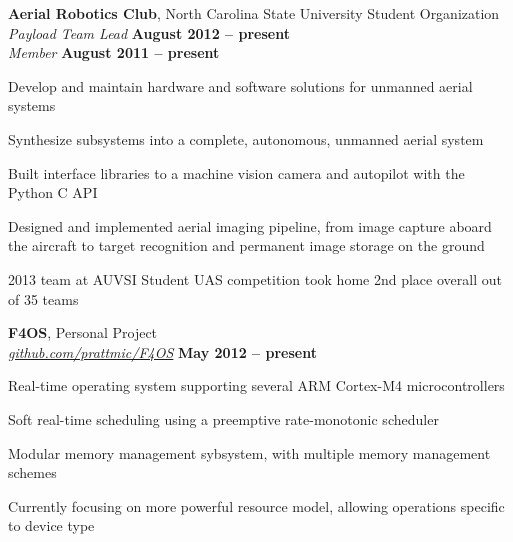 \documentclass[margin,line,letterpaper]{resume}
\begin{document}
\begin{resume}
    \textbf{Aerial Robotics Club}, North Carolina State University Student Organization \vspace{1mm}\\\vspace{1mm}%
    \textsl{Payload Team Lead} \hfill \textbf{August 2012 -- present}\\
    \textsl{Member} \hfill \textbf{August 2011 -- present}\vspace{-3mm}\\
    \begin{list2}
    \item Develop and maintain hardware and software solutions for unmanned aerial systems
    \item Synthesize subsystems into a complete, autonomous, unmanned aerial system
    \item Built interface libraries to a machine vision camera and autopilot with the Python C API
    \item Designed and implemented aerial imaging pipeline, from image capture aboard the aircraft
        to target recognition and permanent image storage on the ground
    \item 2013 team at AUVSI Student UAS competition took home 2nd place overall out of 35 teams
    \end{list2}\vspace{-1.5mm}

    \textbf{F4OS}, Personal Project\vspace{1mm}\\\vspace{1mm}%
    \textsl{\href{http://github.com/prattmic/F4OS}{github.com/prattmic/F4OS}}  \hfill \textbf{May 2012 -- present} \vspace{-3mm}\\\vspace{-1mm}%
    \begin{list2}
    \item Real-time operating system supporting several ARM Cortex-M4 microcontrollers
    \item Soft real-time scheduling using a preemptive rate-monotonic scheduler
    \item Modular memory management sybsystem, with multiple memory management schemes
    \item Currently focusing on more powerful resource model, allowing operations specific to device type
    \end{list2}\vspace{-1.5mm}


\end{resume}
\end{document}
